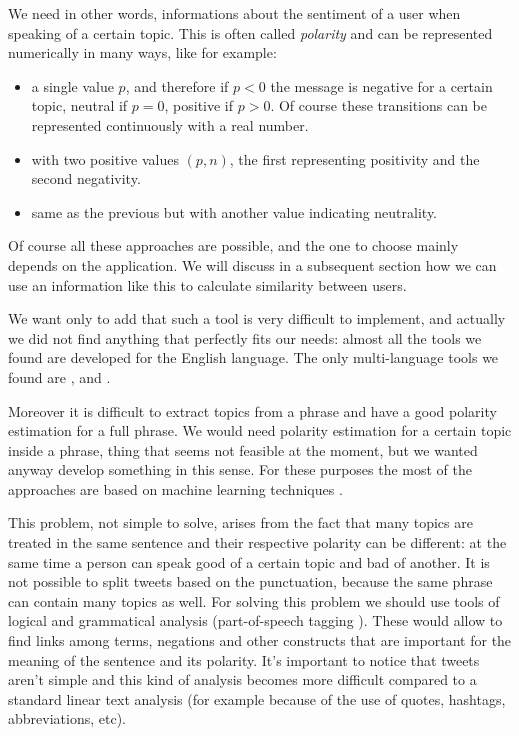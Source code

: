 \documentclass[a4paper,11pt,oneside]{article}
\begin{document}
We need in other words, informations about the sentiment of a user when speaking of a certain topic. This is often called \textit{polarity} and can be represented numerically in many ways, like for example: 
\begin{itemize}
\item a single value $p$, and therefore if $p < 0$ the message is negative for a certain topic, neutral if $p = 0$, positive if $p > 0$. Of course these transitions can be represented continuously with a real number.
\item with two positive values $(p,n)$, the first representing positivity and the second negativity.
\item same as the previous but with another value indicating neutrality.
\end{itemize}

Of course all these approaches are possible, and the one to choose mainly depends on the application. We will discuss in a subsequent section how we can use an information like this to calculate similarity between users.

We want only to add that such a tool is very difficult to implement, and actually we did not find anything that perfectly fits our needs: almost all the tools we found are developed for the English language. The only multi-language tools we found are \cite{sentiment}, \cite{tromp} and \cite{Kin}.

Moreover it is difficult to extract topics from a phrase and have a good polarity estimation for a full phrase. We would need polarity estimation for a certain topic inside a phrase, thing that seems not feasible at the moment, but we wanted anyway develop something in this sense.
For these purposes the most of the approaches are based on machine learning techniques \cite{sentiment, baccianella}.

This problem, not simple to solve, arises from the fact that many topics are treated in the same sentence and their respective polarity can be different: at the same time a person can speak good of a certain topic and bad of another. It is not possible to split tweets based on the punctuation, because the same phrase can contain many topics as well. For solving this problem we should use tools of logical and grammatical analysis (part-of-speech tagging \cite{pos}). These would allow to find links among terms, negations and other constructs that are important for the meaning of the sentence and its polarity.
It's important to notice that tweets aren't simple and this kind of analysis becomes more difficult compared to a standard linear text analysis (for example because of the use of quotes, hashtags, abbreviations, etc). 
\end{document}
